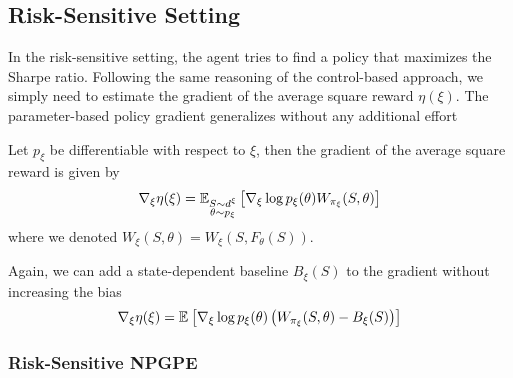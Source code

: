\subsection{Risk-Sensitive Setting}
In the risk-sensitive setting, the agent tries to find a policy that maximizes the Sharpe ratio. Following the same reasoning of the control-based approach, we simply need to estimate the gradient of the average square reward $\eta(\xi)$. The parameter-based policy gradient generalizes without any additional effort
\begin{theorem}
	Let $p_\xi$ be differentiable with respect to $\xi$, then the gradient of the average square reward is given by
	\begin{equation}
		\nabla_\xi \eta(\xi) = \E[\substack{S \sim d^\xi\\\theta \sim p_\xi}]{\nabla_\xi \log p_\xi(\theta) W_{\pi_\xi}(S, \theta)}
	\end{equation}
	where we denoted $W_\xi(S, \theta) = W_\xi(S, F_\theta(S))$.
\end{theorem}
Again, we can add a state-dependent baseline $B_\xi(S)$ to the gradient without increasing the bias
\begin{equation}
	\nabla_\xi \eta(\xi) = \E{\nabla_\xi \log p_\xi(\theta) \left(W_{\pi_\xi}(S,
						\theta) - B_\xi(S)\right)}
\end{equation}





\subsubsection{Risk-Sensitive NPGPE}